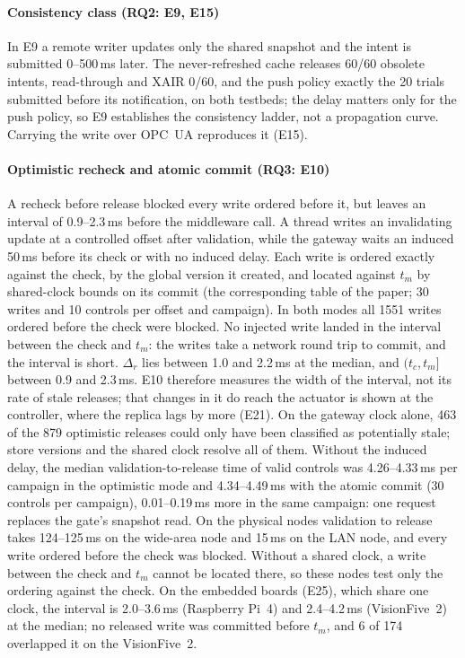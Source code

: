 \documentclass[11pt]{article}
\begin{document}
\paragraph{Consistency class (RQ2: E9, E15)}
In E9 a remote writer updates only the shared snapshot and the intent is submitted 0--500\,ms later. The never-refreshed cache releases 60/60 obsolete intents, read-through and XAIR 0/60, and the push policy exactly the 20 trials submitted before its notification, on both testbeds; the delay matters only for the push policy, so E9 establishes the consistency ladder, not a propagation curve. Carrying the write over OPC~UA reproduces it (E15).

\paragraph{Optimistic recheck and atomic commit (RQ3: E10)}
A recheck before release blocked every write ordered before it, but leaves an interval of 0.9--2.3\,ms before the middleware call. A thread writes an invalidating update at a controlled offset after validation, while the gateway waits an induced 50\,ms before its check or with no induced delay. Each write is ordered exactly against the check, by the global version it created, and located against $t_m$ by shared-clock bounds on its commit (the corresponding table of the paper; 30 writes and 10 controls per offset and campaign). In both modes all 1551 writes ordered before the check were blocked. No injected write landed in the interval between the check and $t_m$: the writes take a network round trip to commit, and the interval is short. $\Delta_r$ lies between 1.0 and 2.2\,ms at the median, and $(t_c,t_m]$ between 0.9 and 2.3\,ms. E10 therefore measures the width of the interval, not its rate of stale releases; that changes in it do reach the actuator is shown at the controller, where the replica lags by more (E21). On the gateway clock alone, 463 of the 879 optimistic releases could only have been classified as potentially stale; store versions and the shared clock resolve all of them. Without the induced delay, the median validation-to-release time of valid controls was 4.26--4.33\,ms per campaign in the optimistic mode and 4.34--4.49\,ms with the atomic commit (30 controls per campaign), 0.01--0.19\,ms more in the same campaign: one request replaces the gate's snapshot read. On the physical nodes validation to release takes 124--125\,ms on the wide-area node and 15\,ms on the LAN node, and every write ordered before the check was blocked. Without a shared clock, a write between the check and $t_m$ cannot be located there, so these nodes test only the ordering against the check. On the embedded boards (E25), which share one clock, the interval is 2.0--3.6\,ms (Raspberry Pi~4) and 2.4--4.2\,ms (VisionFive~2) at the median; no released write was committed before $t_m$, and 6 of 174 overlapped it on the VisionFive~2.
\end{document}
